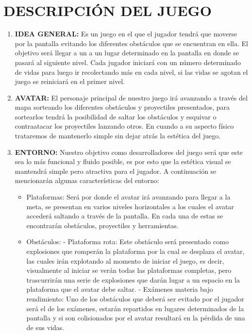 \documentclass{article}
\begin{document}
\section{DESCRIPCIÓN DEL JUEGO} \label{contenido}
\begin{enumerate}
  \item \textbf{IDEA GENERAL:} Es un juego en el que el jugador tendrá que moverse por la pantalla evitando los diferentes obstáculos que se encuentran en ella. El objetivo será llegar a un a un lugar determinado en la pantalla en donde se pasará al siguiente nivel. Cada jugador iniciará con un número determinado de vidas para luego ir recolectando más en cada nivel, si las vidas se agotan el juego se reiniciará en el primer nivel.
  \item \textbf{AVATAR:} El personaje principal de nuestro juego irá avanzando a través del mapa sorteando los diferentes obstáculos y proyectiles presentados, para sortearlos tendrá la posibilidad de saltar los obstáculos y esquivar o contraatacar los proyectiles lanzando otros. En cuando a su aspecto físico trataremos de mantenerlo simple sin dejar atrás la estética del juego.
  \item \textbf{ENTORNO:} Nuestro objetivo como desarrolladores del juego será que este sea lo más funcional y fluido posible, es por esto que la estética visual se mantendrá simple pero atractiva para el jugador. A continuación se mencionarán algunas características del entorno:
    \begin{itemize}
        \item Plataformas: Será por donde el avatar irá avanzando para llegar a la meta, se presentan en varios niveles horizontales a los cuales el avatar accederá saltando a través de la pantalla. En cada una de estas se encontrarán obstáculos, proyectiles y herramientas.
        \item Obstáculos:
        \newline
        -	Plataforma rota: Este obstáculo será presentado como explosiones que romperán la plataforma por la cual se desplaza el avatar, las cuales irán explotando al momento de iniciar el juego, es decir, visualmente al iniciar se verán todas las plataformas completas, pero trascurrirán una serie de explosiones que darán lugar a un espacio en la plataforma que el avatar debe saltar.
        \newline
        -   Exámenes materia bajo rendimiento: Uno de los obstáculos que deberá ser evitado por el jugador será el de los exámenes, estarán repartidos en lugares determinados de la pantalla y si son colisionados por el avatar resultará en la pérdida de una de sus vidas.

\end{itemize}
\end{enumerate}
\end{document}
